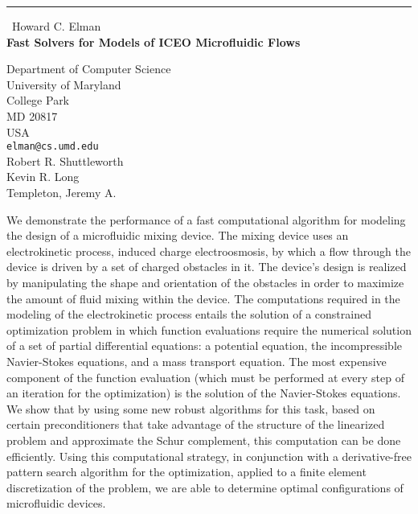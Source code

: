\documentclass{report}
\begin{document}
\begin{center}
\rule{6in}{1pt} \
{\large Howard C. Elman \\
{\bf Fast Solvers for Models of ICEO Microfluidic Flows}}

Department of Computer Science \\ University of Maryland \\ College Park \\ MD 20817 \\ USA
\\
{\tt elman@cs.umd.edu}\\
Robert R. Shuttleworth\\
Kevin R. Long\\
	Templeton, Jeremy A.\end{center}

We demonstrate the performance of a fast computational algorithm
for modeling the design of a microfluidic mixing device. The mixing
device uses an electrokinetic process, induced charge
electroosmosis, by which a flow through the device is driven by a
set of charged obstacles in it. The device's design is realized by
manipulating the shape and orientation of the obstacles in order to
maximize the amount of fluid mixing within the device. The
computations required in the modeling of the electrokinetic process
entails the solution of a constrained optimization problem in which
function evaluations require the numerical solution of a set of
partial differential equations: a potential equation, the
incompressible Navier-Stokes equations, and a mass transport
equation. The most expensive component of the function evaluation
(which must be performed at every step of an iteration for the
optimization) is the solution of the Navier-Stokes equations. We
show that by using some new robust algorithms for this task, based
on certain preconditioners that take advantage of the structure of
the linearized problem and approximate the Schur complement, this
computation can be done efficiently. Using this computational
strategy, in conjunction with a derivative-free pattern search
algorithm for the optimization, applied to a finite element
discretization of the problem, we are able to determine optimal
configurations of microfluidic devices.
\end{document}
